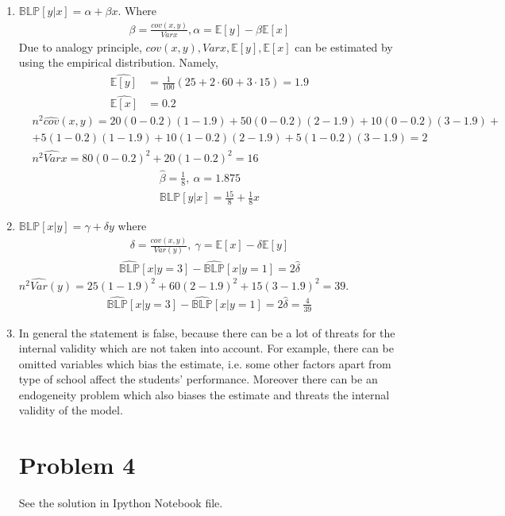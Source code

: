 \documentclass[a4paper]{article}
\newcommand{\expect}{\mathbb{E}}
\begin{document}
\begin{enumerate}
	\item $\mathbb{BLP}[y|x] = \alpha + \beta x$. Where
	\begin{align*}
	\beta = \frac{cov(x, y)}{Varx}, \alpha = \expect[y] - \beta \expect[x]
	\end{align*}
	Due to analogy principle, $cov(x, y), Varx, \expect[y], \expect[x]$ can be estimated by using the empirical distribution. Namely,
	\begin{align*}
	\widehat{\expect[y]} &= \frac{1}{100} \left(25 + 2 \cdot 60 + 3 \cdot 15\right) = 1.9\\
	\widehat{\expect[x]} &= 0.2
	\end{align*}
	\begin{align*}
	&n^2\widehat{cov}(x, y) = 20(0 - 0.2)(1 - 1.9) + 50(0-0.2)(2-1.9) + 10(0-0.2)(3-1.9) + \\ &+5(1-0.2)(1-1.9) + 10(1-0.2)(2-1.9)+5(1-0.2)(3-1.9) = 2\\
	&n^2\widehat{Var}x = 80(0-0.2)^2 + 20(1-0.2)^2 = 16
	\end{align*}
	\begin{align*}
	\hat{\beta} = \frac{1}{8},\ \alpha = 1.875\\
	\mathbb{BLP}[y|x] = \frac{15}{8} + \frac{1}{8}x
	\end{align*}
	\item $\mathbb{BLP}[x|y] = \gamma + \delta y$ where
	\begin{align*}
	\delta = \frac{cov(x, y)}{Var(y)},\ \gamma = \expect[x] - \delta \expect[y]
	\end{align*}
	\begin{align*}
	\widehat{\mathbb{BLP}}[x|y = 3] - \widehat{\mathbb{BLP}}[x|y = 1] = 2 \hat{\delta}
	\end{align*}
	$n^2\widehat{Var}(y) = 25(1-1.9)^2+60(2-1.9)^2+15(3-1.9)^2 = 39$.
	\begin{align*}
	\widehat{\mathbb{BLP}}[x|y = 3] - \widehat{\mathbb{BLP}}[x|y = 1] = 2 \hat{\delta} = \frac{4}{39}
	\end{align*}
	\item In general the statement is false, because there can be a lot of threats for the internal validity which are not taken into account. For example, there can be omitted variables which bias the estimate, i.e. some other factors apart from type of school affect the students' performance. Moreover there can be an endogeneity problem which also biases the estimate and threats the internal validity of the model.
	\section*{Problem 4}
	See the solution in Ipython Notebook file.
\end{enumerate}
\end{document}
